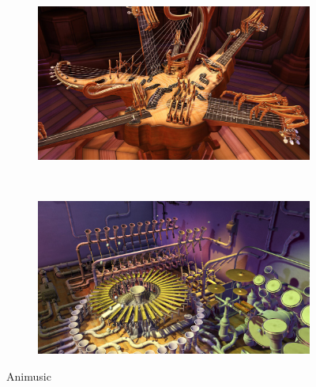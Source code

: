 \documentclass[thesis=B, czech]{FITthesis}[2019/03/06]
\begin{document}

\begin{figure}[h]
\centering
  \begin{subfigure}[b]{1.0\textwidth}
    \includegraphics[width=\textwidth]{images/animusic1.jpg}
  \end{subfigure}\\
  \vspace{5pt}
  \begin{subfigure}[b]{1.0\textwidth}
    \includegraphics[width=\textwidth]{images/animusic2.jpg}
  \end{subfigure}
   
    \caption{ \label{fig:animusic}Animusic}
\end{figure}
\end{document}
